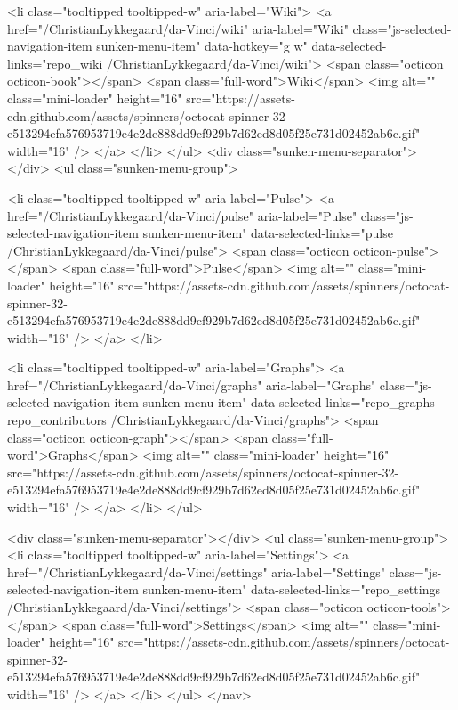      <li class="tooltipped tooltipped-w" aria-label="Wiki">
        <a href="/ChristianLykkegaard/da-Vinci/wiki" aria-label="Wiki" class="js-selected-navigation-item sunken-menu-item" data-hotkey="g w" data-selected-links="repo_wiki /ChristianLykkegaard/da-Vinci/wiki">
          <span class="octicon octicon-book"></span> <span class="full-word">Wiki</span>
          <img alt="" class="mini-loader" height="16" src="https://assets-cdn.github.com/assets/spinners/octocat-spinner-32-e513294efa576953719e4e2de888dd9cf929b7d62ed8d05f25e731d02452ab6c.gif" width="16" />
</a>      </li>
  </ul>
  <div class="sunken-menu-separator"></div>
  <ul class="sunken-menu-group">

    <li class="tooltipped tooltipped-w" aria-label="Pulse">
      <a href="/ChristianLykkegaard/da-Vinci/pulse" aria-label="Pulse" class="js-selected-navigation-item sunken-menu-item" data-selected-links="pulse /ChristianLykkegaard/da-Vinci/pulse">
        <span class="octicon octicon-pulse"></span> <span class="full-word">Pulse</span>
        <img alt="" class="mini-loader" height="16" src="https://assets-cdn.github.com/assets/spinners/octocat-spinner-32-e513294efa576953719e4e2de888dd9cf929b7d62ed8d05f25e731d02452ab6c.gif" width="16" />
</a>    </li>

    <li class="tooltipped tooltipped-w" aria-label="Graphs">
      <a href="/ChristianLykkegaard/da-Vinci/graphs" aria-label="Graphs" class="js-selected-navigation-item sunken-menu-item" data-selected-links="repo_graphs repo_contributors /ChristianLykkegaard/da-Vinci/graphs">
        <span class="octicon octicon-graph"></span> <span class="full-word">Graphs</span>
        <img alt="" class="mini-loader" height="16" src="https://assets-cdn.github.com/assets/spinners/octocat-spinner-32-e513294efa576953719e4e2de888dd9cf929b7d62ed8d05f25e731d02452ab6c.gif" width="16" />
</a>    </li>
  </ul>


    <div class="sunken-menu-separator"></div>
    <ul class="sunken-menu-group">
      <li class="tooltipped tooltipped-w" aria-label="Settings">
        <a href="/ChristianLykkegaard/da-Vinci/settings" aria-label="Settings" class="js-selected-navigation-item sunken-menu-item" data-selected-links="repo_settings /ChristianLykkegaard/da-Vinci/settings">
          <span class="octicon octicon-tools"></span> <span class="full-word">Settings</span>
          <img alt="" class="mini-loader" height="16" src="https://assets-cdn.github.com/assets/spinners/octocat-spinner-32-e513294efa576953719e4e2de888dd9cf929b7d62ed8d05f25e731d02452ab6c.gif" width="16" />
</a>      </li>
    </ul>
</nav>

